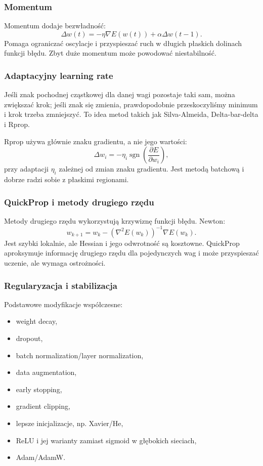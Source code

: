 \subsubsection{Momentum}

Momentum dodaje bezwładność:
\[
\Delta w(t)=-\eta\nabla E(w(t))+\alpha\Delta w(t-1).
\]
Pomaga ograniczać oscylacje i przyspieszać ruch w długich płaskich dolinach funkcji błędu. Zbyt duże momentum może powodować niestabilność.

\subsubsection{Adaptacyjny learning rate}

Jeśli znak pochodnej cząstkowej dla danej wagi pozostaje taki sam, można zwiększać krok; jeśli znak się zmienia, prawdopodobnie przeskoczyliśmy minimum i krok trzeba zmniejszyć. To idea metod takich jak Silva-Almeida, Delta-bar-delta i Rprop.

Rprop używa głównie znaku gradientu, a nie jego wartości:
\[
\Delta w_i=-\eta_i \operatorname{sgn}\left(\frac{\partial E}{\partial w_i}\right),
\]
przy adaptacji $\eta_i$ zależnej od zmian znaku gradientu. Jest metodą batchową i dobrze radzi sobie z płaskimi regionami.

\subsubsection{QuickProp i metody drugiego rzędu}

Metody drugiego rzędu wykorzystują krzywiznę funkcji błędu. Newton:
\[
w_{k+1}=w_k-\left(\nabla^2E(w_k)\right)^{-1}\nabla E(w_k).
\]
Jest szybki lokalnie, ale Hessian i jego odwrotność są kosztowne. QuickProp aproksymuje informację drugiego rzędu dla pojedynczych wag i może przyspieszać uczenie, ale wymaga ostrożności.

\subsubsection{Regularyzacja i stabilizacja}

Podstawowe modyfikacje współczesne:
\begin{itemize}
  \item weight decay,
  \item dropout,
  \item batch normalization/layer normalization,
  \item data augmentation,
  \item early stopping,
  \item gradient clipping,
  \item lepsze inicjalizacje, np. Xavier/He,
  \item ReLU i jej warianty zamiast sigmoid w głębokich sieciach,
  \item Adam/AdamW.
\end{itemize}

